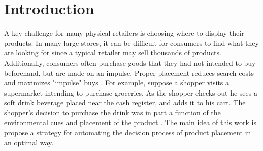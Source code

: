 \section{Introduction}

A key challenge for many physical retailers is choosing where to display their products. In many large stores, it can be difficult for consumers to find what they are looking for since a typical retailer may sell thousands of products. Additionally, consumers often purchase goods that they had not intended to buy beforehand, but are made on an impulse. Proper placement reduces search costs and maximizes "impulse" buys \cite{Badgaiyan}. For example, suppose a shopper visits a supermarket intending to purchase groceries. As the shopper checks out he sees a soft drink beverage placed near the cash register, and adds it to his cart. The shopper's decision to purchase the drink was in part a function of the environmental cues and placement of the product \cite{Mattila}. The main idea of this work is propose a strategy for automating the decision process of product placement in an optimal way.



